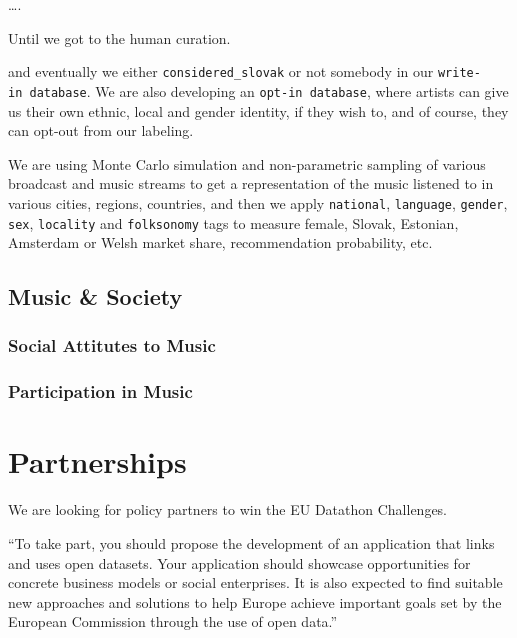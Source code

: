 \documentclass[
  a4paper,
  openany, a4paper, oneside]{book}
\begin{document}
\ldots.

Until we got to the human curation.

and eventually we either \texttt{considered\_slovak} or not somebody in our \texttt{write-in\ database}. We are also developing an \texttt{opt-in\ database}, where artists can give us their own ethnic, local and gender identity, if they wish to, and of course, they can opt-out from our labeling.

We are using Monte Carlo simulation and non-parametric sampling of various broadcast and music streams to get a representation of the music listened to in various cities, regions, countries, and then we apply \texttt{national}, \texttt{language}, \texttt{gender}, \texttt{sex}, \texttt{locality} and \texttt{folksonomy} tags to measure female, Slovak, Estonian, Amsterdam or Welsh market share, recommendation probability, etc.

\hypertarget{music-society}{%
\section{Music \& Society}\label{music-society}}

\hypertarget{social-attitutes-to-music}{%
\subsection{Social Attitutes to Music}\label{social-attitutes-to-music}}

\hypertarget{participation-in-music}{%
\subsection{Participation in Music}\label{participation-in-music}}

\hypertarget{partnerships}{%
\chapter{Partnerships}\label{partnerships}}

We are looking for policy partners to win the EU Datathon Challenges.

``To take part, you should propose the development of an application that links and uses open datasets. Your application should showcase opportunities for concrete business models or social enterprises. It is also expected to find suitable new approaches and solutions to help Europe achieve important goals set by the European Commission through the use of open data.''
\end{document}
